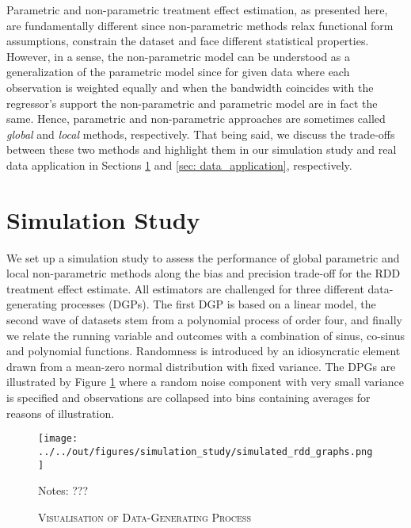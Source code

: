 \documentclass[11pt, a4paper, leqno]{article}
\numberwithin{equation}{section}
\numberwithin{figure}{section}
\numberwithin{table}{section}
\numberwithin{algorithm}{section}
\begin{document}
Parametric and non-parametric treatment effect estimation, as presented here, are fundamentally different since non-parametric methods relax functional form assumptions, constrain the dataset and face different statistical properties. However, in a sense, the non-parametric model can be understood as a generalization of the parametric model since for given data where each observation is weighted equally and when the bandwidth coincides with the regressor's support the non-parametric and parametric model are in fact the same. Hence, parametric and non-parametric approaches are sometimes called \textit{global} and \textit{local} methods, respectively. That being said, we discuss the trade-offs between these two methods and highlight them in our simulation study and real data application in Sections \ref{sec:sim_study} and \ref{sec: data_application}, respectively.


\section{Simulation Study} %
\label{sec:sim_study}

We set up a simulation study to assess the performance of global parametric and local non-parametric methods along the bias and precision trade-off for the RDD treatment effect estimate. All estimators are challenged for three different data-generating processes (DGPs). The first DGP is based on a linear model, the second wave of datasets stem from a polynomial process of order four, and finally we relate the running variable and outcomes with a combination of sinus, co-sinus and polynomial functions. Randomness is introduced by an idiosyncratic element drawn from a mean-zero normal distribution with fixed variance. The DPGs are illustrated by Figure \ref{fig: dgp} where a random noise component with very small variance is specified and observations are collapsed into bins containing averages for reasons of illustration.

\begin{figure}[H]
	\centering
	\texttt{[image: ../../out/figures/simulation\_study/simulated\_rdd\_graphs.png]}
	\caption{\textsc{Visualisation of Data-Generating Process}}
	\label{fig: dgp}
	\medskip
	\justify
	\footnotesize{Notes: ???}
\end{figure}
\end{document}
